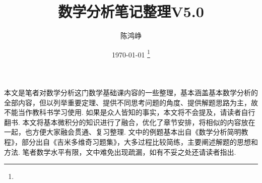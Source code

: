 \documentclass{note}
\title{数学分析笔记整理V5.0}
\author{陈鸿峥}
\date{{\builddatemonth\today} \footnote{\text{Build \builddate\today}}}%
\renewcommand{\thefootnote}{\fnsymbol{footnote}}
\begin{document}
\maketitle
\renewcommand{\thefootnote}{\arabic{footnote}}
\setcounter{footnote}{0}

\setcounter{tocdepth}{2}%
\tableofcontents
\bigskip\bigskip\bigskip

\par 本文是笔者对数学分析这门数学基础课内容的一些整理，基本涵盖基本数学分析的全部内容，但以列举重要定理、提供不同思考问题的角度、提供解题思路为主，故不能当作教科书学习使用. 如果是众人皆知的事实，本文将不会提及，请读者自行翻书. 本文将基本微积分的知识进行了融合，优化了章节安排，将相似的内容放在一起，也方便大家融会贯通、复习整理. 文中的例题基本出自《数学分析简明教程》，部分出自《吉米多维奇习题集》，大多过程比较简练，主要阐述解题的思想和方法. 笔者数学水平有限，文中难免出现疏漏，如有不妥之处还请读者指出.


















\end{document}
